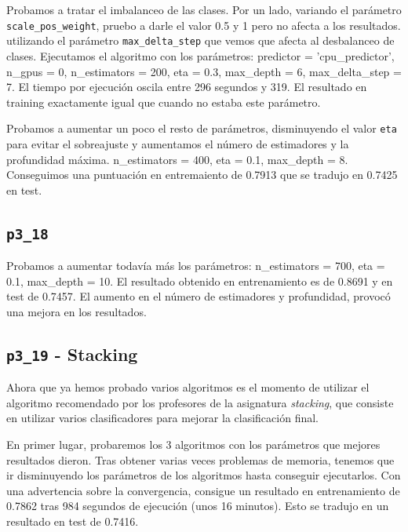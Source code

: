 \documentclass[a4paper, 20pt]{article}
\begin{document}
Probamos a tratar el imbalanceo de las clases. Por un lado, variando el parámetro \texttt{scale\_pos\_weight}, pruebo a darle el valor 0.5 y 1 pero no afecta a los resultados. utilizando el parámetro \texttt{max\_delta\_step} que vemos que afecta al desbalanceo de clases. Ejecutamos el algoritmo con los parámetros: {\ttfamily predictor = 'cpu\_predictor', n\_gpus = 0, n\_estimators = 200, eta = 0.3, max\_depth = 6, max\_delta\_step = 7}. El tiempo por ejecución oscila entre 296 segundos y 319. El resultado en training exactamente igual que cuando no estaba este parámetro.

Probamos a aumentar un poco el resto de parámetros, disminuyendo el valor \texttt{eta} para evitar el sobreajuste y aumentamos el número de estimadores y la profundidad máxima. {\ttfamily n\_estimators = 400, eta = 0.1, max\_depth = 8}. Conseguimos una puntuación en entremaiento de 0.7913 que se tradujo en 0.7425 en test.

\subsection{\texttt{p3\_18}}

Probamos a aumentar todavía más los parámetros: {\ttfamily n\_estimators = 700, eta = 0.1, max\_depth = 10}. El resultado obtenido en entrenamiento es de 0.8691 y en test de 0.7457. El aumento en el número de estimadores y profundidad, provocó una mejora en los resultados.


\subsection{\texttt{p3\_19} - Stacking}

Ahora que ya hemos probado varios algoritmos es el momento de utilizar el algoritmo recomendado por los profesores de la asignatura \textit{stacking}, que consiste en utilizar varios clasificadores para mejorar la clasificación final.

En primer lugar, probaremos los 3 algoritmos con los parámetros que mejores resultados dieron. Tras obtener varias veces problemas de memoria, tenemos que ir disminuyendo los parámetros de los algoritmos hasta conseguir ejecutarlos. Con una advertencia sobre la convergencia, consigue un resultado en entrenamiento de 0.7862 tras 984 segundos de ejecución (unos 16 minutos). Esto se tradujo en un resultado en test de 0.7416.
  
\end{document}

